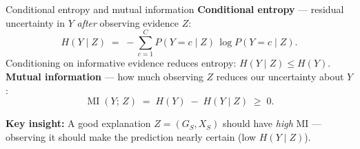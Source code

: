 \documentclass[xcolor=svgnames,aspectratio=169]{beamer}
\begin{document}
\begin{frame}{Conditional entropy and mutual information}
    \textbf{Conditional entropy} --- residual uncertainty in $Y$ \emph{after} observing evidence $Z$:
    \begin{equation}
        H(Y \mid Z) \;=\; -\sum_{c=1}^{C} P(Y=c \mid Z)\,\log P(Y=c \mid Z).
    \end{equation}
    Conditioning on informative evidence reduces entropy: $H(Y \mid Z) \leq H(Y)$.\\[6pt]
    \textbf{Mutual information} --- how much observing $Z$ reduces our uncertainty about $Y$:
    \begin{equation}
        \operatorname{MI}(Y;\, Z) \;=\; H(Y) \;-\; H(Y \mid Z) \;\geq\; 0.
    \end{equation}
    \begin{center}
    \end{center}
    \vspace{2pt}
    \textbf{Key insight:} A good explanation $Z = (G_S, X_S)$ should have \emph{high} MI --- observing it should make the prediction nearly certain (low $H(Y \mid Z)$).
\end{frame}
\end{document}
